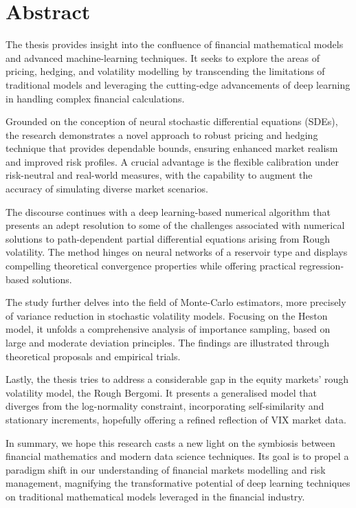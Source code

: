 \chapter*{Abstract}

The thesis provides insight into the confluence of financial mathematical models and advanced machine-learning techniques. It seeks to explore the areas of pricing, hedging, and volatility modelling by transcending the limitations of traditional models and leveraging the cutting-edge advancements of deep learning in handling complex financial calculations.

Grounded on the conception of neural stochastic differential equations (SDEs), the research demonstrates a novel approach to robust pricing and hedging technique that provides dependable bounds, ensuring enhanced market realism and improved risk profiles. A crucial advantage is the flexible calibration under risk-neutral and real-world measures, with the capability to augment the accuracy of simulating diverse market scenarios.

The discourse continues with a deep learning-based numerical algorithm that presents an adept resolution to some of the challenges associated with numerical solutions to path-dependent partial differential equations arising from Rough volatility. The method hinges on neural networks of a reservoir type and displays compelling theoretical convergence properties while offering practical regression-based solutions.

The study further delves into the field of Monte-Carlo estimators, more precisely of variance reduction in stochastic volatility models. Focusing on the Heston model, it unfolds a comprehensive analysis of importance sampling, based on large and moderate deviation principles. The findings are illustrated through theoretical proposals and empirical trials.

Lastly, the thesis tries to address a considerable gap in the equity markets' rough volatility model, the Rough Bergomi. It presents a generalised model that diverges from the log-normality constraint, incorporating self-similarity and stationary increments, hopefully offering a refined reflection of VIX market data.

In summary, we hope this research casts a new light on the symbiosis between financial mathematics and modern data science techniques. Its goal is to propel a paradigm shift in our understanding of financial markets modelling and risk management, magnifying the transformative potential of deep learning techniques on traditional mathematical models leveraged in the financial industry.